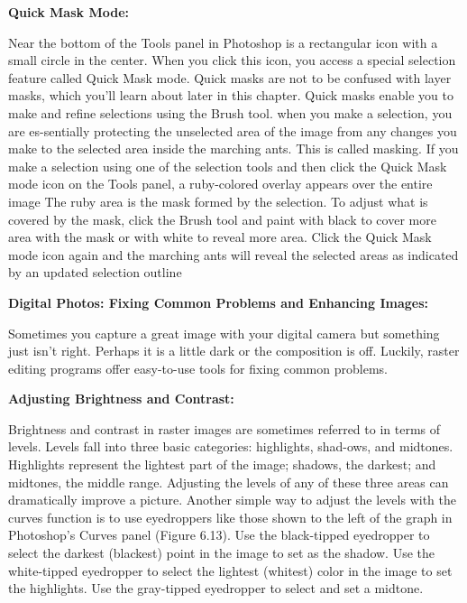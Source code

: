 \documentclass{report}
\begin{document}
    \bigbreak \noindent \bigbreak \noindent 
    \begin{Large}
      \textbf{Quick Mask Mode:}
    \end{Large}
    \bigbreak \noindent 
    Near the bottom of the Tools panel in Photoshop is a rectangular icon with a small circle in the center. When you click this icon, you access a special selection feature called Quick Mask mode. Quick masks are not to be confused with layer masks, which you’ll learn about later in this chapter. Quick masks enable you to make and refine selections using the Brush tool.
    \bigbreak \noindent 
    when you make a selection, you are es-sentially protecting the unselected area of the image from any changes you make to the selected area inside the marching ants. This is called masking. If you make a selection using one of the selection tools and then click the Quick Mask mode icon on the Tools panel, a ruby-colored overlay appears over the entire image
    \bigbreak \noindent
    The ruby area is the mask formed by the selection. To adjust what is covered by the mask, click the Brush tool and paint with black to cover more area with the mask or with white to reveal more area. Click the Quick Mask mode icon again and the marching ants will reveal the selected areas as indicated by an updated selection outline

    \bigbreak \noindent \bigbreak \noindent 
    \begin{Large}
      \textbf{Digital Photos: Fixing Common Problems and Enhancing Images:}
    \end{Large}
    \bigbreak \noindent 
    Sometimes you capture a great image with your digital camera but something just isn’t right. Perhaps it is a little dark or the composition is off. Luckily, raster editing programs offer easy-to-use tools for fixing common problems.

    \bigbreak \noindent \bigbreak \noindent 
    \begin{large}
      \textbf{Adjusting Brightness and Contrast:}
    \end{large}
    \bigbreak \noindent 
    Brightness and contrast in raster images are sometimes referred to in terms of levels. Levels fall into three basic categories: highlights, shad-ows, and midtones. Highlights represent the lightest part of the image; shadows, the darkest; and midtones, the middle range. Adjusting the levels of any of these three areas can dramatically improve a picture.
    \bigbreak \noindent 
    Another simple way to adjust the levels with the curves function is to use eyedroppers like those shown to the left of the graph in Photoshop’s Curves panel (Figure 6.13). Use the black-tipped eyedropper to select the darkest (blackest) point in the image to set as the shadow. Use the white-tipped eyedropper to select the lightest (whitest) color in the image to set the highlights. Use the gray-tipped eyedropper to select and set a midtone.
\end{document}
